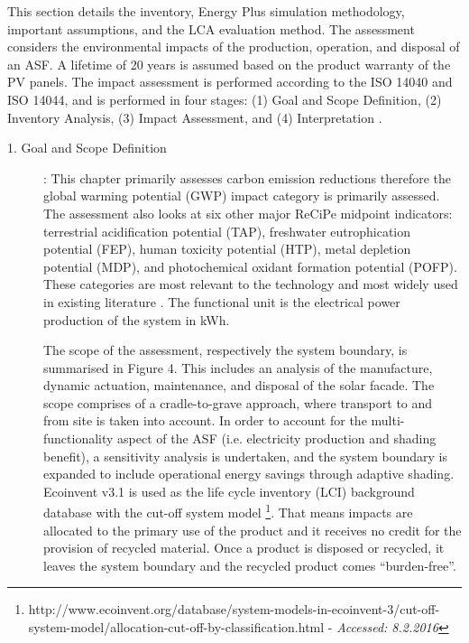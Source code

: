 
This section details the inventory, Energy Plus simulation methodology, important assumptions, and the LCA evaluation method. The assessment considers the environmental impacts of the production, operation, and disposal of an ASF. A lifetime of 20 years is assumed based on the product warranty of the PV panels. The impact assessment is performed according to the ISO 14040 and ISO 14044, and is performed in four stages: (1) Goal and Scope Definition, (2) Inventory Analysis, (3) Impact Assessment, and (4) Interpretation \cite{finkbeiner2006new}.\\






\begin{description}

\item[1. Goal and Scope Definition]: This chapter primarily assesses carbon emission reductions therefore the global warming potential (GWP) impact category is primarily assessed. The assessment also looks at six other major ReCiPe midpoint indicators: terrestrial acidification potential (TAP), freshwater eutrophication potential (FEP), human toxicity potential (HTP), metal depletion potential (MDP), and photochemical oxidant formation potential (POFP). These categories are most relevant to the technology and most widely used in existing literature \cite{ortiz2009sustainability}. The functional unit is the electrical power production of the system in kWh.

The scope of the assessment, respectively the system boundary, is summarised in Figure 4. This includes an analysis of the manufacture, dynamic actuation, maintenance, and disposal of the solar facade. The scope comprises of a cradle-to-grave approach, where transport to and from site is taken into account. 
In order to account for the multi-functionality aspect of the ASF (i.e. electricity production and shading benefit), a sensitivity analysis is undertaken, and the system boundary is expanded to include operational energy savings through adaptive shading. Ecoinvent v3.1 \cite{frischknecht2005ecoinvent} is used as the life cycle inventory (LCI) background database with the cut-off system model \footnote{http://www.ecoinvent.org/database/system-models-in-ecoinvent-3/cut-off-system-model/allocation-cut-off-by-classification.html   -  \textit{Accessed: 8.2.2016}}. That means impacts are allocated to the primary use of the product and it receives no credit for the provision of recycled material. Once a product is disposed or recycled, it leaves the system boundary and the recycled product comes “burden-free”.


\end{description}
